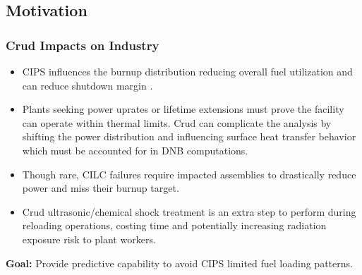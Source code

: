 \documentclass[t, pdftex]{beamer}
\begin{document}
\subsection*{Motivation}
\begin{frame}
\frametitle{Crud Impacts on Industry}
\vspace{-12pt}
\begin{itemize}
    \item CIPS influences the burnup distribution reducing overall fuel utilization and can reduce shutdown margin  \cite{lange17}.
    \item Plants seeking power uprates or lifetime extensions must prove the facility can operate within thermal limits.  Crud can complicate the analysis by shifting the power distribution and influencing surface heat transfer behavior which must be accounted for in DNB computations.
    \item Though rare, CILC failures require impacted assemblies to drastically reduce power and miss their burnup target.
    \item Crud ultrasonic/chemical shock treatment is an extra step to perform during reloading operations, costing time and potentially increasing radiation exposure risk to plant workers.
\end{itemize}
\textbf{Goal:} Provide predictive capability to avoid CIPS limited fuel loading patterns.
\end{frame}

\end{document}
